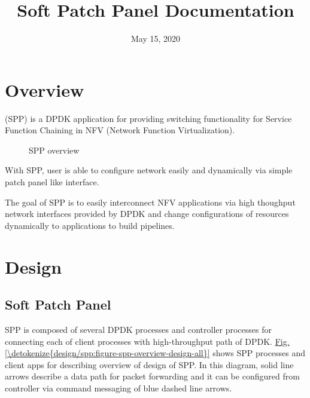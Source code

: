 \documentclass[a4paper,11pt,openany,oneside,english]{sphinxmanual}
\title{Soft Patch Panel Documentation}
\date{May 15, 2020}
\author{}
\begin{document}
\pagestyle{empty}
\sphinxmaketitle
\pagestyle{plain}
\sphinxtableofcontents
\pagestyle{normal}
\label{\detokenize{index::doc}}



\chapter{Overview}
\label{\detokenize{overview:overview}}\label{\detokenize{overview:spp-overview-overview}}\label{\detokenize{overview::doc}}
(SPP) is a DPDK application for providing switching
functionality for Service Function Chaining in
NFV (Network Function Virtualization).

\begin{figure}[htbp]
\centering
\capstart

\noindent{}
\caption{SPP overview}\label{\detokenize{overview:id1}}\end{figure}

With SPP, user is able to configure network easily and dynamically
via simple patch panel like interface.

The goal of SPP is to easily interconnect NFV applications via high
thoughput network interfaces provided by DPDK and change configurations
of resources dynamically to applications to build pipelines.


\chapter{Design}
\label{\detokenize{design/index:design}}\label{\detokenize{design/index:spp-design-index}}\label{\detokenize{design/index::doc}}

\section{Soft Patch Panel}
\label{\detokenize{design/spp:soft-patch-panel}}\label{\detokenize{design/spp:spp-overview-design}}\label{\detokenize{design/spp::doc}}
SPP is composed of several DPDK processes and controller processes for
connecting each of client processes with high-throughput path of DPDK.
\hyperref[\detokenize{design/spp:figure-spp-overview-design-all}]{Fig.\@ \ref{\detokenize{design/spp:figure-spp-overview-design-all}}} shows SPP processes and client apps
for describing overview of design of SPP. In this diagram, solid line arrows
describe a data path for packet forwarding and it can be configured from
controller via command messaging of blue dashed line arrows.
\end{document}
